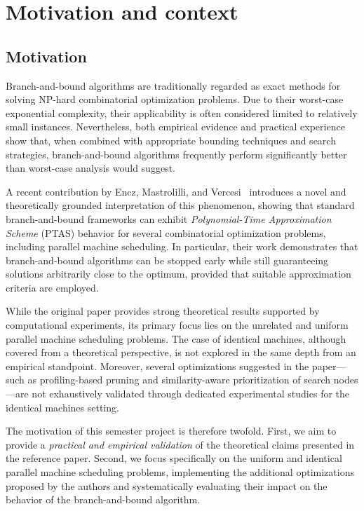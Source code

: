 \chapter{Motivation and context}
\label{ch:motivation_and_context}

\section{Motivation}
\label{sec:motivation}

Branch-and-bound algorithms are traditionally regarded as exact methods for solving NP-hard combinatorial optimization problems.
Due to their worst-case exponential complexity, their applicability is often considered limited to relatively small instances.
Nevertheless, both empirical evidence and practical experience show that, when combined with appropriate bounding techniques and search strategies, branch-and-bound algorithms frequently perform significantly better than worst-case analysis would suggest.

A recent contribution by Encz, Mastrolilli, and Vercesi~\cite{bb-ptas} introduces a novel and theoretically grounded interpretation of this phenomenon, showing that standard branch-and-bound frameworks can exhibit \emph{Polynomial-Time Approximation Scheme} (PTAS) behavior for several combinatorial optimization problems, including parallel machine scheduling.
In particular, their work demonstrates that branch-and-bound algorithms can be stopped early while still guaranteeing solutions arbitrarily close to the optimum, provided that suitable approximation criteria are employed.

While the original paper provides strong theoretical results supported by computational experiments, its primary focus lies on the unrelated and uniform parallel machine scheduling problems.
The case of identical machines, although covered from a theoretical perspective, is not explored in the same depth from an empirical standpoint.
Moreover, several optimizations suggested in the paper—such as profiling-based pruning and similarity-aware prioritization of search nodes—are not exhaustively validated through dedicated experimental studies for the identical machines setting.

The motivation of this semester project is therefore twofold.
First, we aim to provide a \emph{practical and empirical validation} of the theoretical claims presented in the reference paper.
Second, we focus specifically on the uniform and identical parallel machine scheduling problems, implementing the additional optimizations proposed by the authors and systematically evaluating their impact on the behavior of the branch-and-bound algorithm.

